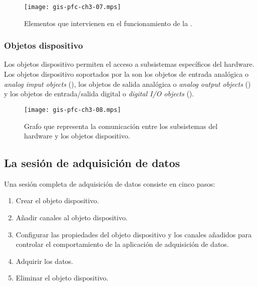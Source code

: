 \begin{figure}
	\begin{center}
		\texttt{[image: gis-pfc-ch3-07.mps]}
	\end{center}
	\caption[Elementos que intervienen en el funcionamiento de la \datx{}]{Elementos que intervienen en el funcionamiento de la \datx{}.}
	\label{fig:toolcomp}
\end{figure}

\subsubsection{Objetos dispositivo}

Los objetos dispositivo permiten el acceso a subsistemas específicos del hardware. Los objetos dispositivo soportados por la \datx{} son los objetos de entrada analógica o \emph{analog imput objects} (), los objetos de salida analógica o \emph{analog output objects} () y los objetos de entrada/salida digital o \emph{digital I/O objects} ().

\begin{figure}
	\begin{center}
		\texttt{[image: gis-pfc-ch3-08.mps]}
	\end{center}
	\caption[Comunicación entre los subsistemas del hardware y los objetos dispositivo]{Grafo que representa la comunicación entre los subsistemas del hardware y los objetos dispositivo.}
	\label{fig:subsystemsOO}
\end{figure}


\subsection{La sesión de adquisición de datos}

Una sesión completa de adquisición de datos consiste en cinco pasos:

\begin{enumerate}
	\item Crear el objeto dispositivo.
	\item Añadir canales al objeto dispositivo.
	\item Configurar las propiedades del objeto dispositivo y los canales añadidos para controlar el comportamiento de la aplicación de adquisición de datos.
	\item Adquirir los datos.
	\item Eliminar el objeto dispositivo.
\end{enumerate}


